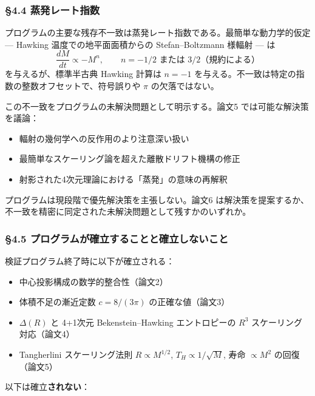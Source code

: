\documentclass[a4paper,11pt]{ltjsarticle}
\theoremstyle{definition}
\providecommand{\tightlist}{\setlength{\itemsep}{0pt}\setlength{\parskip}{0pt}}
\begin{document}
\subsubsection{§4.4
蒸発レート指数}\label{ux84b8ux767aux30ecux30fcux30c8ux6307ux6570}

プログラムの主要な残存不一致は蒸発レート指数である。最簡単な動力学的仮定
--- Hawking 温度での地平面面積からの Stefan--Boltzmann 様輻射 --- は
\[\frac{dM}{dt} \propto -M^{n}, \qquad n = -1/2 \text{ または } 3/2 \text{（規約による）}\]
を与えるが、標準半古典 Hawking 計算は \(n = -1\)
を与える。不一致は特定の指数の整数オフセットで、符号誤りや \(\pi\)
の欠落ではない。

この不一致をプログラムの未解決問題として明示する。論文5
では可能な解決策を議論：

\begin{itemize}
\tightlist
\item
  輻射の幾何学への反作用のより注意深い扱い
\item
  最簡単なスケーリング論を超えた離散ドリフト機構の修正
\item
  射影された4次元理論における「蒸発」の意味の再解釈
\end{itemize}

プログラムは現段階で優先解決策を主張しない。論文6
は解決策を提案するか、不一致を精密に同定された未解決問題として残すかのいずれか。

\subsubsection{§4.5
プログラムが確立することと確立しないこと}\label{ux30d7ux30edux30b0ux30e9ux30e0ux304cux78baux7acbux3059ux308bux3053ux3068ux3068ux78baux7acbux3057ux306aux3044ux3053ux3068}

検証プログラム終了時に以下が確立される：

\begin{itemize}
\tightlist
\item
  中心投影構成の数学的整合性（論文2）
\item
  体積不足の漸近定数 \(c = 8/(3\pi)\) の正確な値（論文3）
\item
  \(\Delta(R)\) と 4+1次元 Bekenstein--Hawking エントロピーの \(R^3\)
  スケーリング対応（論文4）
\item
  Tangherlini スケーリング法則 \(R \propto M^{1/2}\),
  \(T_H \propto 1/\sqrt{M}\), 寿命 \(\propto M^2\) の回復（論文5）
\end{itemize}

以下は確立\textbf{されない}：
\end{document}
